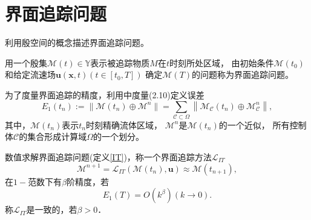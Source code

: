 
\section{界面追踪问题}
利用殷空间\cite{zhang2018fourth}的概念描述界面追踪问题。
\begin{defn}[界面追踪问题]
  \label{IT}
  用一个殷集$\mathcal{M}(t) \in \mathbb{Y}$表示被追踪物质$M$在$t$时刻所处区域，
  由初始条件$\mathcal{M}(t_0)$和给定流速场$\boldsymbol{u}(\boldsymbol{x},t)(t\in [t_0,T])$
  确定$\mathcal{M}(T)$的问题称为界面追踪问题。
\end{defn}
为了度量界面追踪的精度，利用\cite{zhang2018fourth}中度量(2.10)定义误差
\begin{equation}
  \label{eq:geomError}
  E_1(t_n) := \|\mathcal{M}(t_n) \oplus
  \mathcal{M}^{n}\| = \sum_{{\mathcal C}\subset \Omega}
  \left\|\mathcal{M}_{\mathcal C}(t_n) \oplus
    \mathcal{M}_{\mathcal C}^{n}\right\|,
\end{equation}
其中，$\mathcal{M}(t_n)$表示$t_n$时刻精确流体区域，
$\mathcal{M}^{n}$是$\mathcal{M}(t_n)$的一个近似，
所有控制体$\mathcal{C}$的集合形成计算域$\Omega$的一个划分。

\begin{defn}[界面追踪方法的精度]
  数值求解界面追踪问题(定义\ref{IT})，称一个界面追踪方法$\mathcal{L}_{IT}$
  \begin{equation}
    \label{eq:ITM}
    \mathcal{M}^{n+1}=\mathcal{L}_{IT}(\mathcal{M}(t_n),\boldsymbol{u})\approx \mathcal{M}(t_{n+1}),
  \end{equation}
  在$1-$范数下有$\beta$阶精度，若
  \begin{displaymath}
    E_1(T) = O(k^{\beta})(k \to 0).
  \end{displaymath}
  称$\mathcal{L}_{IT}$是一致的，若$\beta > 0$．
\end{defn}

